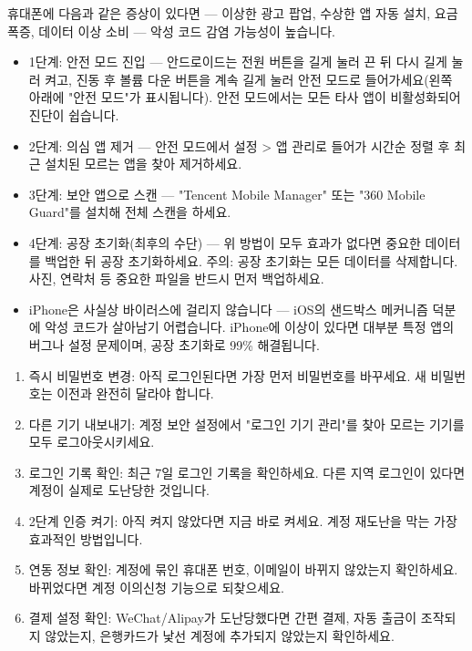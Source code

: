 
휴대폰에 다음과 같은 증상이 있다면 — 이상한 광고 팝업, 수상한 앱 자동 설치, 요금 폭증, 데이터 이상 소비 — 악성 코드 감염 가능성이 높습니다.

\begin{itemize}
  \item 1단계: 안전 모드 진입 — 안드로이드는 전원 버튼을 길게 눌러 끈 뒤 다시 길게 눌러 켜고, 진동 후 볼륨 다운 버튼을 계속 길게 눌러 안전 모드로 들어가세요(왼쪽 아래에 "안전 모드"가 표시됩니다). 안전 모드에서는 모든 타사 앱이 비활성화되어 진단이 쉽습니다.
  \item 2단계: 의심 앱 제거 — 안전 모드에서 설정 > 앱 관리로 들어가 시간순 정렬 후 최근 설치된 모르는 앱을 찾아 제거하세요.
  \item 3단계: 보안 앱으로 스캔 — "Tencent Mobile Manager" 또는 "360 Mobile Guard"를 설치해 전체 스캔을 하세요.
  \item 4단계: 공장 초기화(최후의 수단) — 위 방법이 모두 효과가 없다면 중요한 데이터를 백업한 뒤 공장 초기화하세요. 주의: 공장 초기화는 모든 데이터를 삭제합니다. 사진, 연락처 등 중요한 파일을 반드시 먼저 백업하세요.
  \item iPhone은 사실상 바이러스에 걸리지 않습니다 — iOS의 샌드박스 메커니즘 덕분에 악성 코드가 살아남기 어렵습니다. iPhone에 이상이 있다면 대부분 특정 앱의 버그나 설정 문제이며, 공장 초기화로 99\% 해결됩니다.
\end{itemize}


\begin{enumerate}
  \item 즉시 비밀번호 변경: 아직 로그인된다면 가장 먼저 비밀번호를 바꾸세요. 새 비밀번호는 이전과 완전히 달라야 합니다.
  \item 다른 기기 내보내기: 계정 보안 설정에서 "로그인 기기 관리"를 찾아 모르는 기기를 모두 로그아웃시키세요.
  \item 로그인 기록 확인: 최근 7일 로그인 기록을 확인하세요. 다른 지역 로그인이 있다면 계정이 실제로 도난당한 것입니다.
  \item 2단계 인증 켜기: 아직 켜지 않았다면 지금 바로 켜세요. 계정 재도난을 막는 가장 효과적인 방법입니다.
  \item 연동 정보 확인: 계정에 묶인 휴대폰 번호, 이메일이 바뀌지 않았는지 확인하세요. 바뀌었다면 계정 이의신청 기능으로 되찾으세요.
  \item 결제 설정 확인: WeChat/Alipay가 도난당했다면 간편 결제, 자동 출금이 조작되지 않았는지, 은행카드가 낯선 계정에 추가되지 않았는지 확인하세요.
\end{enumerate}


